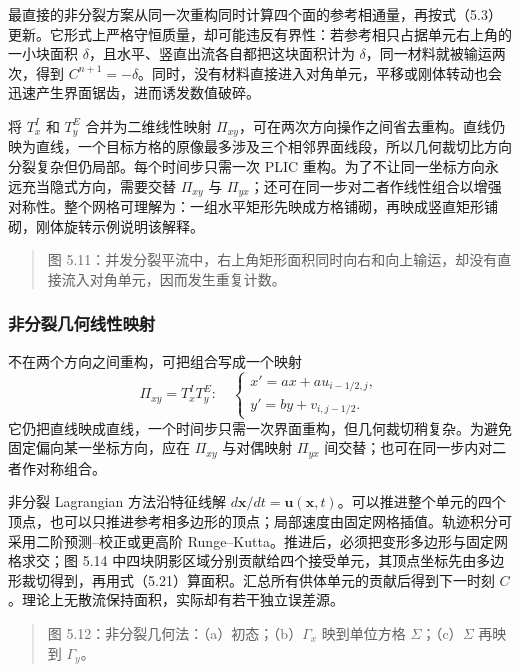 \documentclass[11pt,a4paper,openany,fontset=none]{ctexbook}
\begin{document}
最直接的非分裂方案从同一次重构同时计算四个面的参考相通量，再按式（5.3）更新。它形式上严格守恒质量，却可能违反有界性：若参考相只占据单元右上角的一小块面积 $\delta$，且水平、竖直出流各自都把这块面积计为 $\delta$，同一材料就被输运两次，得到 $C^{n+1}=-\delta$。同时，没有材料直接进入对角单元，平移或刚体转动也会迅速产生界面锯齿，进而诱发数值破碎。

将 $T_x^I$ 和 $T_y^E$ 合并为二维线性映射 $\Pi_{xy}$，可在两次方向操作之间省去重构。直线仍映为直线，一个目标方格的原像最多涉及三个相邻界面线段，所以几何裁切比方向分裂复杂但仍局部。每个时间步只需一次 PLIC 重构。为了不让同一坐标方向永远充当隐式方向，需要交替 $\Pi_{xy}$ 与 $\Pi_{yx}$；还可在同一步对二者作线性组合以增强对称性。整个网格可理解为：一组水平矩形先映成方格铺砌，再映成竖直矩形铺砌，刚体旋转示例说明该解释。

\begin{quote}\small 图 5.11：并发分裂平流中，右上角矩形面积同时向右和向上输运，却没有直接流入对角单元，因而发生重复计数。\end{quote}
\subsubsection{非分裂几何线性映射}

不在两个方向之间重构，可把组合写成一个映射
\begin{equation}
\Pi_{xy}=T_x^I T_y^E:\quad
\begin{cases}
x'=ax+au_{i-1/2,j},\\
y'=by+v_{i,j-1/2}.
\end{cases}
\tag{5.47}
\end{equation}
它仍把直线映成直线，一个时间步只需一次界面重构，但几何裁切稍复杂。为避免固定偏向某一坐标方向，应在 $\Pi_{xy}$ 与对偶映射 $\Pi_{yx}$ 间交替；也可在同一步内对二者作对称组合。

非分裂 Lagrangian 方法沿特征线解 $d\bm x/dt=\bm u(\bm x,t)$。可以推进整个单元的四个顶点，也可以只推进参考相多边形的顶点；局部速度由固定网格插值。轨迹积分可采用二阶预测--校正或更高阶 Runge--Kutta。推进后，必须把变形多边形与固定网格求交；图 5.14 中四块阴影区域分别贡献给四个接受单元，其顶点坐标先由多边形裁切得到，再用式（5.21）算面积。汇总所有供体单元的贡献后得到下一时刻 $C$。理论上无散流保持面积，实际却有若干独立误差源。

\begin{quote}\small 图 5.12：非分裂几何法：（a）初态；（b）$\Gamma_x$ 映到单位方格 $\Sigma$；（c）$\Sigma$ 再映到 $\Gamma_y$。\end{quote}
\end{document}
